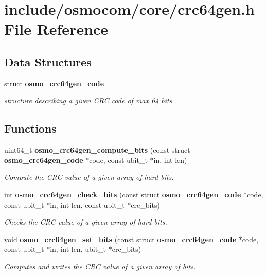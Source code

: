 \section{include/osmocom/core/crc64gen.h File Reference}
\label{crc64gen_8h}
\subsection*{Data Structures}
\begin{DoxyCompactItemize}
\item 
struct {\bf osmo\-\_\-crc64gen\-\_\-code}
\begin{DoxyCompactList}\small\item\em structure describing a given C\-R\-C code of max 64 bits \end{DoxyCompactList}\end{DoxyCompactItemize}
\subsection*{Functions}
\begin{DoxyCompactItemize}
\item 
uint64\-\_\-t {\bf osmo\-\_\-crc64gen\-\_\-compute\-\_\-bits} (const struct {\bf osmo\-\_\-crc64gen\-\_\-code} $\ast$code, const ubit\-\_\-t $\ast$in, int len)
\begin{DoxyCompactList}\small\item\em Compute the C\-R\-C value of a given array of hard-\/bits. \end{DoxyCompactList}\item 
int {\bf osmo\-\_\-crc64gen\-\_\-check\-\_\-bits} (const struct {\bf osmo\-\_\-crc64gen\-\_\-code} $\ast$code, const ubit\-\_\-t $\ast$in, int len, const ubit\-\_\-t $\ast$crc\-\_\-bits)
\begin{DoxyCompactList}\small\item\em Checks the C\-R\-C value of a given array of hard-\/bits. \end{DoxyCompactList}\item 
void {\bf osmo\-\_\-crc64gen\-\_\-set\-\_\-bits} (const struct {\bf osmo\-\_\-crc64gen\-\_\-code} $\ast$code, const ubit\-\_\-t $\ast$in, int len, ubit\-\_\-t $\ast$crc\-\_\-bits)
\begin{DoxyCompactList}\small\item\em Computes and writes the C\-R\-C value of a given array of bits. \end{DoxyCompactList}\end{DoxyCompactItemize}
